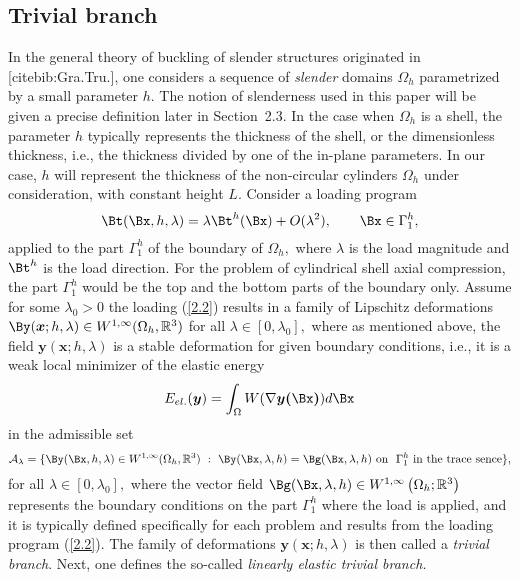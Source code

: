 \subsection{Trivial branch}
\label{sec:2.2}

In the general theory of buckling of slender structures originated in [cite{bib:Gra.Tru.}], one considers a sequence of \textit{slender} domains $\Omega_h$ parametrized by a small parameter $h$. The notion of slenderness used in this paper will be given a precise definition later in Section~2.3. In the case when $\Omega_h$ is a shell, the parameter $h$ typically represents the thickness of the shell, or the dimensionless thickness, i.e., the thickness divided by one of the in-plane parameters. In our case, $h$ will represent the thickness of the non-circular cylinders $\Omega_h$ under consideration, with constant height $L$. Consider a loading program 
\begin{equation}
\label{2.2}
\Bt(\Bx,h,\lambda)=\lambda \Bt^h(\Bx)+O(\lambda^2),\qquad \Bx\in \Gamma_1^h,
\end{equation}
applied to the part $\Gamma_1^h$ of the boundary of $\Omega_h,$ where $\lambda$ is the load magnitude and $\Bt^h$ is the load direction. 
For the problem of cylindrical shell axial compression, the part $\Gamma_1^h$ would be the top and the bottom parts of the boundary only. 
Assume for some $\lambda_0>0$ the loading (\ref{2.2}) results in a family of Lipschitz deformations $\By (\bm x;h,\lambda)\in W^{1,\infty}(\Omega_h,\mathbb R^3)$ for all $\lambda\in[0,\lambda_0],$ where as mentioned above, the field $\bm y (\bm x;h,\lambda)$ is a stable deformation for given boundary conditions, i.e., it is a weak local minimizer of the elastic energy 
$$E_{el.}(\boldsymbol{y})=\int_{\Omega} W(\nabla \boldsymbol{y(\Bx)}) d \Bx$$
in the admissible set 
\begin{equation}
\label{2.3}
\mathcal{A}_\lambda=\{ \By(\Bx,h,\lambda)\in W^{1,\infty}(\Omega_h,\mathbb R^3) \ : 
\ \By(\Bx,\lambda,h)=\Bg(\Bx,\lambda,h)  \ \text{on}\  \ \Gamma_1^h  \ \text{in the trace sence}\},
\end{equation}
for all $\lambda\in [0,\lambda_0],$ where the vector field $\Bg(\Bx,\lambda,h)\in W^{1,\infty}\left(\Omega_{h} ; \mathbb{R}^{3}\right)$ represents the boundary conditions on the part $\Gamma_1^h$ where the load is applied, and it is typically defined specifically for each problem and results from the loading program (\ref{2.2}). The family of deformations $\bm y (\bm x;h,\lambda)$ is then called a \textit{trivial branch}. Next, one defines the so-called \textit{linearly elastic trivial branch.}

